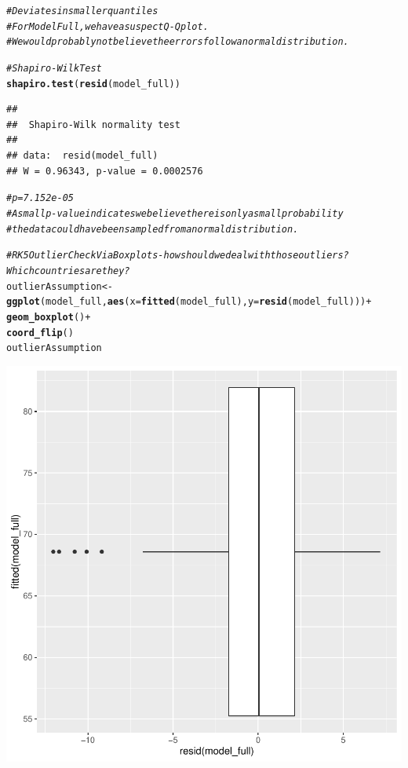 \documentclass{article}\usepackage[]{graphicx}\usepackage[]{color}
\makeatletter
\newcommand{\hlcom}[1]{\textcolor[rgb]{0.678,0.584,0.686}{\textit{#1}}}%
\newcommand{\hlopt}[1]{\textcolor[rgb]{0,0,0}{#1}}%
\newcommand{\hlstd}[1]{\textcolor[rgb]{0.345,0.345,0.345}{#1}}%
\newcommand{\hlkwb}[1]{\textcolor[rgb]{0.69,0.353,0.396}{#1}}%
\newcommand{\hlkwc}[1]{\textcolor[rgb]{0.333,0.667,0.333}{#1}}%
\newcommand{\hlkwd}[1]{\textcolor[rgb]{0.737,0.353,0.396}{\textbf{#1}}}%
\newenvironment{kframe}{%
 \def\at@end@of@kframe{}%
 \ifinner\ifhmode%
  \def\at@end@of@kframe{\end{minipage}}%
  \begin{minipage}{\columnwidth}%
 \fi\fi%
 \def\FrameCommand##1{\hskip\@totalleftmargin \hskip-\fboxsep
 \colorbox{shadecolor}{##1}\hskip-\fboxsep
     \hskip-\linewidth \hskip-\@totalleftmargin \hskip\columnwidth}%
 \MakeFramed {\advance\hsize-\width
   \@totalleftmargin\z@ \linewidth\hsize
   \@setminipage}}%
 {\par\unskip\endMakeFramed%
 \at@end@of@kframe}
\newenvironment{knitrout}{}{} %
\makeatother
\begin{document}
\begin{knitrout}
{}


\begin{kframe}\begin{alltt}
\hlcom{# Deviates in smaller quantiles}
\hlcom{# For Model Full, we have a suspect Q-Q plot. }
\hlcom{# We would probably not believe the errors follow a normal distribution.}

\hlcom{# Shapiro-Wilk Test}
\hlkwd{shapiro.test}\hlstd{(}\hlkwd{resid}\hlstd{(model_full))}
\end{alltt}
\begin{verbatim}
## 
## 	Shapiro-Wilk normality test
## 
## data:  resid(model_full)
## W = 0.96343, p-value = 0.0002576
\end{verbatim}
\begin{alltt}
\hlcom{# p = 7.152e-05}
\hlcom{# A small p-value indicates we believe there is only a small probability }
\hlcom{# the data could have been sampled from a normal distribution.}

\hlcom{#RK 5 Outlier Check Via Boxplots- how should we deal with those outliers? Which countries are they? }
\hlstd{outlierAssumption} \hlkwb{<-} \hlkwd{ggplot}\hlstd{(model_full,} \hlkwd{aes}\hlstd{(}\hlkwc{x}\hlstd{=}\hlkwd{fitted}\hlstd{(model_full),} \hlkwc{y}\hlstd{=}\hlkwd{resid}\hlstd{(model_full)))} \hlopt{+}
  \hlkwd{geom_boxplot}\hlstd{()} \hlopt{+}
  \hlkwd{coord_flip}\hlstd{()}
\hlstd{outlierAssumption}
\end{alltt}


{\ttfamily\noindent\color{warningcolor}{\#\# Warning: Continuous x aesthetic -- did you forget aes(group=...)?}}\end{kframe}

{\centering \includegraphics[width=.6\linewidth]{figure/Analysis-Rnwauto-report-23} 

}
\end{knitrout}
\end{document}

